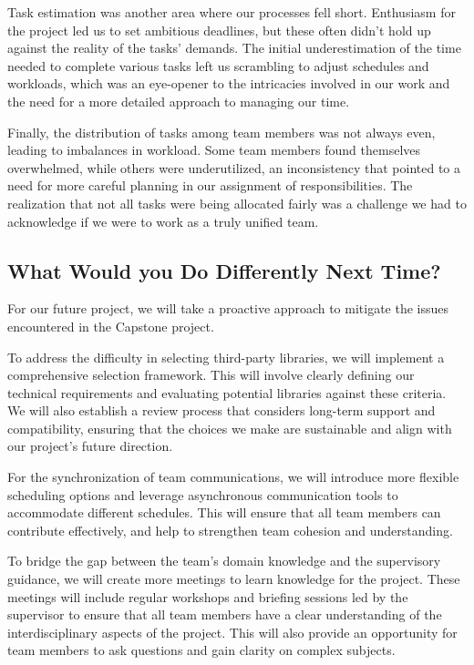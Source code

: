 \documentclass{article}
\begin{document}
Task estimation was another area where our processes fell short. Enthusiasm for the project led us to set ambitious deadlines, but these often didn't hold up against the reality of the tasks' demands. The initial underestimation of the time needed to complete various tasks left us scrambling to adjust schedules and workloads, which was an eye-opener to the intricacies involved in our work and the need for a more detailed approach to managing our time.

Finally, the distribution of tasks among team members was not always even, leading to imbalances in workload. Some team members found themselves overwhelmed, while others were underutilized, an inconsistency that pointed to a need for more careful planning in our assignment of responsibilities. The realization that not all tasks were being allocated fairly was a challenge we had to acknowledge if we were to work as a truly unified team.

\subsection{What Would you Do Differently Next Time?}
For our future project, we will take a proactive approach to mitigate the issues encountered in the Capstone project.

To address the difficulty in selecting third-party libraries, we will implement a comprehensive selection framework. This will involve clearly defining our technical requirements and evaluating potential libraries against these criteria. We will also establish a review process that considers long-term support and compatibility, ensuring that the choices we make are sustainable and align with our project’s future direction.

For the synchronization of team communications, we will introduce more flexible scheduling options and leverage asynchronous communication tools to accommodate different schedules. This will ensure that all team members can contribute effectively, and help to strengthen team cohesion and understanding.

To bridge the gap between the team’s domain knowledge and the supervisory guidance, we will create more meetings to learn knowledge for the project. These meetings will include regular workshops and briefing sessions led by the supervisor to ensure that all team members have a clear understanding of the interdisciplinary aspects of the project. This will also provide an opportunity for team members to ask questions and gain clarity on complex subjects.
\end{document}

